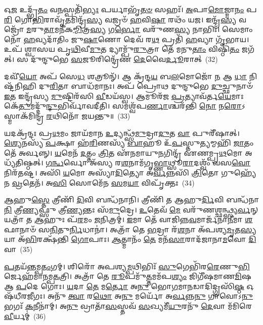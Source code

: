 𑌓\-\ul{𑌜} 𑌉𑌦𑍍𑌭𑍃᳴\-\ul{𑌤𑌂} 𑌵\-\ul{𑌨}\-𑌸𑍍𑌪𑌤𑌿᳴\-\ul{𑌭𑍍𑌯𑌃} 𑌪𑌰𑍍𑌯𑌾𑌭𑍃᳴\-\ul{𑌤}\-\-\ul{𑍞} 𑌸𑌹𑌃᳴। \ul{𑌅}\-𑌪𑌾\-\ul{𑌮𑍋}\-𑌜𑍍𑌮𑌾\-\ul{𑌨𑌂} 𑌪\-\ul{𑌰𑌿} 𑌗𑍋\-\ul{𑌭𑌿}\-𑌰𑌾𑌵𑍃᳴\-\ul{𑌤}\-𑌮𑌿𑌨𑍍𑌦𑍍𑌰᳴\-\ul{𑌸𑍍𑌯} 𑌵𑌜𑍍𑌰𑍞᳴ \ul{𑌹}\-𑌵𑌿\-\ul{𑌷𑌾} 𑌰𑌥𑌂᳴ 𑌯𑌜। 𑌇𑌨𑍍𑌦𑍍𑌰᳴\-\ul{𑌸𑍍𑌯} 𑌵𑌜𑍍𑌰𑍋᳴ \ul{𑌮}\-𑌰𑍁\-\ul{𑌤𑌾}\-𑌮𑌨𑍀᳴𑌕\-\ul{𑌮𑍍𑌮𑌿}\-𑌤𑍍𑌰\-\ul{𑌸𑍍𑌯} 𑌗\-\ul{𑌰𑍍𑌭𑍋} 𑌵𑌰𑍁᳴𑌣\-\ul{𑌸𑍍𑌯} 𑌨𑌾𑌭𑌿𑌃᳴। 𑌸𑍇𑌮𑌾𑌂 𑌨𑍋᳴ \ul{𑌹}\-𑌵𑍍𑌯𑌦𑌾᳴𑌤𑌿𑌂 𑌜𑍁\-\ul{𑌷𑌾}\-𑌣𑍋 𑌦𑍇𑌵᳴ 𑌰\-\ul{𑌥} 𑌪𑍍𑌰𑌤𑌿᳴ \ul{𑌹}\-𑌵𑍍𑌯𑌾 𑌗𑍃᳴𑌭𑌾𑌯। 𑌉𑌪᳴ 𑌶𑍍𑌵𑌾𑌸𑌯 𑌪𑍃\-\ul{𑌥𑌿}\-𑌵𑍀\-\ul{𑌮𑍁}\-𑌤 𑌦𑍍𑌯𑌾𑌮𑍍𑌪𑍁᳴\-\ul{𑌰𑍁}\-𑌤𑍍𑌰𑌾 𑌤𑍇᳴ 𑌮𑌨𑍁\-\ul{𑌤𑌾𑌂} 𑌵𑌿𑌷𑍍𑌠𑌿᳴\-\ul{𑌤𑌂} 𑌜𑌗᳴𑌤𑍍। 𑌸 𑌦𑍁᳴𑌨𑍍𑌦𑍁𑌭𑍇 \ul{𑌸}\-𑌜𑍂𑌰𑌿𑌨𑍍𑌦𑍍𑌰𑍇᳴𑌣 \ul{𑌦𑍇}\-𑌵𑍈\-\ul{𑌰𑍍𑌦𑍂}\-𑌰𑌾𑌤𑍍~(32)

𑌦𑌵𑍀᳴\-\ul{𑌯𑍋} 𑌅𑌪᳴ 𑌸𑍇\-\ul{𑌧} 𑌶𑌤𑍍𑌰𑍂𑌨𑍍᳴। 𑌆 𑌕𑍍𑌰᳴𑌨𑍍𑌦\-\ul{𑌯} 𑌬\-\ul{𑌲}\-𑌮𑍋𑌜𑍋᳴ \ul{𑌨} 𑌆 \ul{𑌧𑌾} 𑌨𑌿 𑌷𑍍𑌟᳴𑌨𑌿𑌹𑌿 𑌦𑍁\-\ul{𑌰𑌿}\-𑌤𑌾 𑌬𑌾𑌧᳴𑌮𑌾𑌨𑌃। 𑌅𑌪᳴ 𑌪𑍍𑌰𑍋𑌥 𑌦𑍁𑌨𑍍𑌦𑍁𑌭𑍇 \ul{𑌦𑍁}\-𑌚𑍍𑌛𑍁𑌨𑌾𑍞᳴ \ul{𑌇}\-𑌤 𑌇𑌨𑍍𑌦𑍍𑌰᳴𑌸𑍍𑌯 \ul{𑌮𑍁}\-𑌷𑍍𑌟𑌿𑌰᳴𑌸𑌿 \ul{𑌵𑍀}\-𑌡𑌯᳴𑌸𑍍𑌵। 𑌆𑌮𑍂𑌰᳴𑌜 \ul{𑌪𑍍𑌰}\-𑌤𑍍𑌯𑌾𑌵᳴𑌰𑍍𑌤\-\ul{𑌯𑍇}\-𑌮𑌾𑌃 𑌕𑍇᳴\-\ul{𑌤𑍁}\-𑌮𑌦𑍍𑌦𑍁᳴\-\ul{𑌨𑍍𑌦𑍁}\-𑌭𑌿𑌰𑍍𑌵𑌾᳴𑌵𑌦𑍀𑌤𑌿। 𑌸𑌮𑌶𑍍𑌵᳴𑌪\-\ul{𑌰𑍍𑌣𑌾}\-𑌶𑍍𑌚𑌰᳴𑌨𑍍𑌤𑌿 \ul{𑌨𑍋} 𑌨\-\ul{𑌰𑍋}\-\-𑌽𑌸𑍍𑌮𑌾𑌕᳴𑌮𑌿𑌨𑍍𑌦𑍍𑌰 \ul{𑌰}\-𑌥𑌿𑌨𑍋᳴ 𑌜𑌯𑌨𑍍𑌤𑍁॥~(33)

{\anuvakamend[{𑌧𑌨𑍍𑌵᳴𑌨𑍍𑌮\-\ul{𑌹𑌿}\-𑌮𑌾\-\ul{𑌨𑌂} 𑌬𑍍𑌰𑌾𑌹𑍍𑌮᳴\-\ul{𑌣𑌾}\-𑌸𑍋\-𑌽𑌦𑌿᳴𑌤𑌿𑌃 𑌪𑍃\-\ul{𑌥𑌿}\-𑌵𑍍𑌯𑌾𑌃 𑌪𑌰𑌿᳴ \ul{𑌦𑍂}\-𑌰𑌾𑌦𑍇𑌕᳴𑌚𑌤𑍍𑌵𑌾𑌰𑌿𑍞𑌶𑌚𑍍𑌚}]}%

𑌯𑌦𑌕𑍍𑌰᳴𑌨𑍍𑌦𑌃 𑌪𑍍𑌰\-\ul{𑌥}\-𑌮𑌂 𑌜𑌾𑌯᳴𑌮𑌾𑌨 \ul{𑌉}\-𑌦𑍍𑌯𑌨𑍍𑌥𑍍𑌸᳴\-\ul{𑌮𑍁}\-𑌦𑍍𑌰𑌾\-\ul{𑌦𑍁}\-𑌤 \ul{𑌵𑌾} 𑌪𑍁𑌰𑍀᳴𑌷𑌾𑌤𑍍। \ul{𑌶𑍍𑌯𑍇}\-𑌨𑌸𑍍𑌯᳴ \ul{𑌪}\-𑌕𑍍𑌷𑌾 𑌹᳴\-\ul{𑌰𑌿}\-𑌣𑌸𑍍𑌯᳴ \ul{𑌬𑌾}\-𑌹𑍂 𑌉᳴\-\ul{𑌪}\-𑌸𑍍𑌤𑍁\-\ul{𑌤𑍍𑌯}\-𑌮𑍍𑌮𑌹𑌿᳴ \ul{𑌜𑌾}\-𑌤𑌂 𑌤𑍇᳴ 𑌅𑌰𑍍𑌵𑌨𑍍𑌨𑍍। \ul{𑌯}\-𑌮𑍇𑌨᳴ \ul{𑌦}\-𑌤𑍍𑌤𑌂 \ul{𑌤𑍍𑌰𑌿}\-𑌤 𑌏᳴𑌨𑌮𑌾𑌯𑍁\-\ul{𑌨}\-𑌗𑌿𑌨𑍍𑌦𑍍𑌰᳴ 𑌏𑌣𑌮𑍍𑌪𑍍𑌰\-\ul{𑌥}\-𑌮𑍋 𑌅𑌧𑍍𑌯᳴𑌤𑌿𑌷𑍍𑌠𑌤𑍍। \ul{𑌗}\-\-\ul{𑌨𑍍𑌧}\-𑌰𑍍𑌵𑍋 𑌅᳴𑌸𑍍𑌯 𑌰\-\ul{𑌶}\-𑌨𑌾𑌮᳴𑌗𑍃\-\ul{𑌭𑍍𑌣𑌾}\-𑌥𑍍𑌸𑍂\-\ul{𑌰𑌾}\-𑌦𑌶𑍍𑌵𑌂᳴ 𑌵𑌸\-\ul{𑌵𑍋} 𑌨𑌿𑌰᳴𑌤𑌷𑍍𑌟। 𑌅𑌸𑌿᳴ \ul{𑌯}\-𑌮𑍋 𑌅𑌸𑍍𑌯𑌾᳴\-\ul{𑌦𑌿}\-𑌤𑍍𑌯𑍋 𑌅᳴\-\ul{𑌰𑍍𑌵}\-𑌨𑍍𑌨𑌸𑌿᳴ \ul{𑌤𑍍𑌰𑌿}\-𑌤𑍋 𑌗𑍁𑌹𑍍𑌯𑍇᳴𑌨 \ul{𑌵𑍍𑌰}\-𑌤𑍇𑌨᳴। 𑌅\-\ul{𑌸𑌿} 𑌸𑍋𑌮𑍇᳴𑌨 \ul{𑌸}\-𑌮\-\ul{𑌯𑌾} 𑌵𑌿𑌪𑍃᳴𑌕𑍍𑌤𑌃~(34)

\-\ul{𑌆}\-𑌹𑍁\-\ul{𑌸𑍍𑌤𑍇} 𑌤𑍍𑌰𑍀𑌣𑌿᳴ \ul{𑌦𑌿}\-𑌵𑌿 𑌬𑌨𑍍𑌧᳴𑌨𑌾𑌨𑌿। 𑌤𑍍𑌰𑍀𑌣𑌿᳴ 𑌤 𑌆𑌹𑍁\-\ul{𑌰𑍍𑌦𑌿}\-𑌵𑌿 𑌬𑌨𑍍𑌧᳴𑌨𑌾\-\ul{𑌨𑌿} 𑌤𑍍𑌰𑍀\-\ul{𑌣𑍍𑌯}\-𑌫𑍍𑌸𑍁 𑌤𑍍𑌰𑍀\-\ul{𑌣𑍍𑌯}\-𑌨𑍍𑌤𑌃 𑌸᳴\-\ul{𑌮𑍁}\-𑌦𑍍𑌰𑍇। \ul{𑌉}\-𑌤𑍇𑌵᳴ \ul{𑌮𑍇} 𑌵𑌰𑍁᳴𑌣𑌶𑍍𑌛𑌨𑍍𑌥𑍍𑌸𑍍𑌯\-\ul{𑌰𑍍𑌵}\-𑌨𑍍 𑌯𑌤𑍍𑌰𑌾᳴ 𑌤 \ul{𑌆}\-𑌹𑍁𑌃 𑌪᳴\-\ul{𑌰}\-𑌮𑌂 \ul{𑌜}\-𑌨𑌿𑌤𑍍𑌰𑌮𑍍॑। \ul{𑌇}\-𑌮𑌾 𑌤𑍇᳴ 𑌵𑌾𑌜𑌿𑌨𑍍𑌨\-\ul{𑌵}\-𑌮𑌾𑌰𑍍𑌜᳴𑌨𑌾\-\ul{𑌨𑍀}\-𑌮𑌾 \ul{𑌶}\-𑌫𑌾𑌨𑌾𑍞᳴ 𑌸\-\ul{𑌨𑌿}\-𑌤𑍁\-\ul{𑌰𑍍𑌨𑌿}\-𑌧𑌾𑌨𑌾॑। 𑌅𑌤𑍍𑌰𑌾᳴ 𑌤𑍇 \ul{𑌭}\-𑌦𑍍𑌰𑌾 𑌰᳴\-\ul{𑌶}\-𑌨𑌾 𑌅᳴𑌪𑌶𑍍𑌯\-\ul{𑌮𑍃}\-𑌤\-\ul{𑌸𑍍𑌯} 𑌯𑌾 𑌅᳴\-\ul{𑌭𑌿}\-𑌰𑌕𑍍𑌷᳴𑌨𑍍𑌤𑌿 \ul{𑌗𑍋}\-𑌪𑌾𑌃। \ul{𑌆}\-𑌤𑍍𑌮𑌾𑌨𑌂᳴ \ul{𑌤𑍇} 𑌮𑌨᳴\-\ul{𑌸𑌾}\-𑌰𑌾𑌦᳴𑌜𑌾𑌨𑌾\-\ul{𑌮}\-𑌵𑍋 \ul{𑌦𑌿}\-𑌵𑌾~(35)

\-\ul{𑌪}\-𑌤𑌯᳴𑌨𑍍𑌤𑌮𑍍𑌪\-\ul{𑌤𑌂}\-𑌗𑌮𑍍। 𑌶𑌿𑌰𑍋᳴ 𑌅𑌪𑌶𑍍𑌯\-\ul{𑌮𑍍𑌪}\-𑌥𑌿𑌭𑌿𑌃᳴ \ul{𑌸𑍁}\-𑌗𑍇𑌭𑌿᳴𑌰\-\ul{𑌰𑍇}\-𑌣𑍁\-\ul{𑌭𑌿}\-𑌰𑍍𑌜𑍇𑌹᳴𑌮𑌾𑌨𑌮𑍍𑌪\-\ul{𑌤}\-𑌤𑍍𑌰𑌿। 𑌅𑌤𑍍𑌰𑌾᳴ 𑌤𑍇 \ul{𑌰𑍂}\-𑌪𑌮𑍁᳴\-\ul{𑌤𑍍𑌤}\-𑌮𑌮᳴𑌪\-\ul{𑌶𑍍𑌯𑌂} 𑌜𑌿𑌗𑍀᳴𑌷𑌮𑌾𑌣\-\ul{𑌮𑌿}\-𑌷 𑌆 \ul{𑌪}\-𑌦𑍇 𑌗𑍋𑌃। \ul{𑌯}\-𑌦𑌾 \ul{𑌤𑍇} 𑌮\-\ul{𑌰𑍍𑌤𑍋} 𑌅\-\ul{𑌨𑍁} 𑌭𑍋\-\ul{𑌗}\-𑌮𑌾\-\ul{𑌨}\-𑌡𑌾𑌦𑌿𑌦𑍍𑌗𑍍𑌰𑌸𑌿᳴\-\ul{𑌷𑍍𑌠} 𑌓𑌷᳴𑌧𑍀𑌰𑌜𑍀𑌗𑌃। 𑌅𑌨𑍁᳴ \ul{𑌤𑍍𑌵𑌾} 𑌰\-\ul{𑌥𑍋} 𑌅\-\ul{𑌨𑍁} 𑌮𑌰𑍍𑌯𑍋᳴ 𑌅\-\ul{𑌰𑍍𑌵}\-𑌨𑍍𑌨\-\ul{𑌨𑍁} 𑌗𑌾𑌵𑍋\-𑌽\-\ul{𑌨𑍁} 𑌭𑌗𑌃᳴ \ul{𑌕}\-𑌨𑍀𑌨𑌾॑𑌮𑍍। 𑌅\-\ul{𑌨𑍁} 𑌵𑍍𑌰𑌾𑌤𑌾᳴\-\ul{𑌸}\-𑌸𑍍𑌤𑌵᳴ \ul{𑌸}\-𑌖𑍍𑌯𑌮𑍀᳴\-\ul{𑌯𑍁}\-𑌰𑌨𑍁᳴ \ul{𑌦𑍇}\-𑌵𑌾 𑌮᳴𑌮𑌿𑌰𑍇 \ul{𑌵𑍀}\-𑌰𑍍𑌯𑌮𑍍॑~(36)

